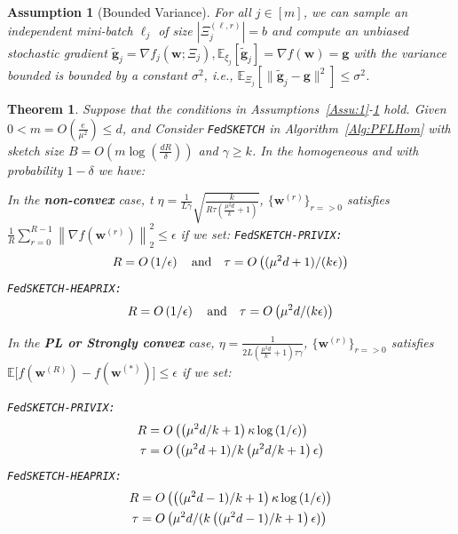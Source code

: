 \documentclass[twoside]{article}
\newtheorem{theorem}{Theorem}
\newtheorem{assumption}{Assumption}
\begin{document}
\begin{assumption}[Bounded Variance]\label{Assu:1.5}
For all $j\in [m]$, we can sample an independent mini-batch $\ell_j$   of size $|\Xi_j^{(\ell,r)}| = b$ and compute an unbiased stochastic gradient  $\tilde{\mathbf{g}}_j = \nabla f_j(\boldsymbol{w}; \Xi_j), \mathbb{E}_{\xi_j}[\tilde{\mathbf{g}}_j] = \nabla f(\boldsymbol{w})=\mathbf{g}$ with  the variance bounded is bounded by a constant $\sigma^2$, i.e., $
\mathbb{E}_{\Xi_j}\left[\|\tilde{\mathbf{g}}_j-\mathbf{g}\|^2\right]\leq \sigma^2$.
\end{assumption}


\begin{theorem}\label{thm:homog_case}
  Suppose that the conditions in Assumptions~\ref{Assu:1}-\ref{Assu:1.5} hold. Given $0<m=O\left(\frac{e}{\mu^2}\right)\leq d$, and Consider \texttt{FedSKETCH} in Algorithm~\ref{Alg:PFLHom} with sketch size $B=O\left(m\log\left(\frac{d R}{\delta}\right)\right)$ and $\gamma\geq k$. In the homogeneous and with probability $1-\delta$ we have:

In the \textbf{non-convex} case, t $\eta=\frac{1}{L\gamma}\sqrt{\frac{k}{R\tau\left(\frac{\mu^2d}{k}+1\right)}}$, $\{ {\boldsymbol{w}}^{(r)}\}_{r=>0}$ satisfies  $\frac{1}{R}\sum_{r=0}^{R-1}\left\|\nabla f({\boldsymbol{w}}^{(r)})\right\|_2^2\leq {\epsilon}$ if we set:  
\noindent \texttt{FedSKETCH-PRIVIX:}    
\begin{equation}\notag
R=O\left(1/\epsilon\right) \quad \textrm{and} \quad \tau=O\left((\mu^2d+1)/(k\epsilon)\right)
 \end{equation}
\noindent \texttt{FedSKETCH-HEAPRIX:} 
\begin{equation}\notag
R=O\left(1/\epsilon\right) \quad \textrm{and} \quad \tau=O\left(\mu^2d/(k\epsilon)\right)
 \end{equation}

 
In the \textbf{PL or Strongly convex} case, $\eta=\frac{1}{2L\left(\frac{\mu^2d}{k}+1\right)\tau\gamma}$, $\{ {\boldsymbol{w}}^{(r)}\}_{r=>0}$ satisfies $\mathbb{E}\Big[f({\boldsymbol{w}}^{(R)})-f({\boldsymbol{w}}^{(*)})\Big]\leq \epsilon$ if  we set:  

\noindent \texttt{FedSKETCH-PRIVIX:}    
\begin{equation}\notag
\begin{split}
R&=O\left(\left(\mu^2d/k+1\right)\kappa\log\left(1/\epsilon\right)\right)\\
\tau&=O\left((\mu^2d+1)/k\left(\mu^2d/k+1\right)\epsilon\right)
  \end{split}
 \end{equation}
\noindent \texttt{FedSKETCH-HEAPRIX:} 
\begin{equation}\notag
\begin{split}
R& = O\left(\left((\mu^2d-1)/k+1\right)\kappa\log\left(1/\epsilon\right)\right)\\
 \tau &=O\left(\mu^2d/(k\left((\mu^2d-1)/k+1\right)\epsilon)\right)
  \end{split}
 \end{equation}


\end{theorem}
\end{document}
